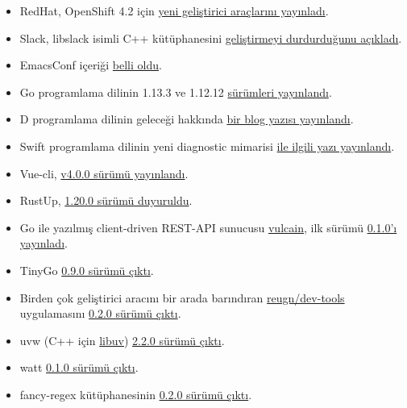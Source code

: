 \documentclass[11pt]{article}
\begin{document}
\begin{itemize}
\item RedHat, OpenShift 4.2 için \href{https://developers.redhat.com/blog/2019/10/16/developer-tools-openshift/}{yeni geliştirici araçlarını yayınladı}.
\item Slack, libslack isimli C++ kütüphanesini \href{https://slack.engineering/client-consistency-at-slack-beyond-libslack-c9cfbe778fb7}{geliştirmeyi durdurduğunu açıkladı}.
\item EmacsConf içeriği \href{https://emacsconf.org/2019/schedule}{belli oldu}.
\item Go programlama dilinin 1.13.3 ve 1.12.12 \href{https://groups.google.com/forum/\#!topic/golang-announce/R3XK-Wf-Mtk}{sürümleri yayınlandı}.
\item D programlama dilinin geleceği hakkında \href{https://dlang.org/blog/2019/10/15/my-vision-of-ds-future/}{bir blog yazısı yayınlandı}.
\item Swift programlama dilinin yeni diagnostic mimarisi \href{https://swift.org/blog/new-diagnostic-arch-overview/}{ile ilgili yazı
yayınlandı}.
\item Vue-cli, \href{https://app.releasly.co/releases/vuejs/vue-cli/4\_0\_0}{v4.0.0 sürümü yayınlandı}.
\item RustUp, \href{https://blog.rust-lang.org/2019/10/15/Rustup-1.20.0.html}{1.20.0 sürümü duyuruldu}.
\item Go ile yazılmış client-driven REST-API sunucusu \href{https://github.com/dunglas/vulcain}{vulcain}, ilk sürümü \href{https://github.com/dunglas/vulcain/releases/tag/v0.1.0}{0.1.0'ı
yayınladı}.
\item TinyGo \href{https://github.com/tinygo-org/tinygo/releases/tag/v0.9.0}{0.9.0 sürümü çıktı}.
\item Birden çok geliştirici aracını bir arada barındıran \href{https://github.com/reugn/dev-tools}{reugn/dev-tools}
uygulamasını \href{https://github.com/reugn/dev-tools/releases/tag/v0.2.0}{0.2.0 sürümü çıktı}.
\item uvw (C++ için \href{https://github.com/libuv/libuv}{libuv}) \href{https://github.com/skypjack/uvw/releases/tag/v2.2.0\_libuv-v1.33}{2.2.0 sürümü çıktı}.
\item watt \href{https://github.com/dtolnay/watt/releases/tag/0.1.0}{0.1.0 sürümü çıktı}.
\item fancy-regex kütüphanesinin \href{https://github.com/fancy-regex/fancy-regex/releases/tag/0.2.0}{0.2.0 sürümü çıktı}.
\end{itemize}
\end{document}
